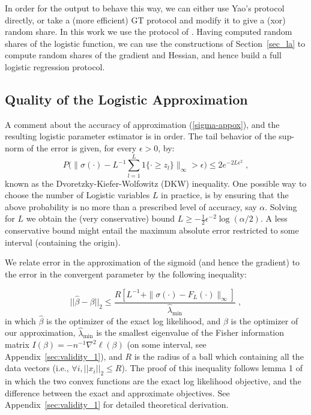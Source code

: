 \documentclass[11pt]{article}
\begin{document}
In order for the output to behave this way, we can either use Yao's protocol directly, or take a (more efficient) GT protocol and modify it to give a (xor) random share.  In this work we use the protocol of \citet{gt_proto}.  Having computed random shares of the logistic function, we can use the constructions of Section~\ref{sec_la} to compute random shares of the gradient and Hessian, and hence build a full logistic regression protocol.
















\subsection{Quality of the Logistic Approximation}\label{sec:ECDF}
A comment about the accuracy of approximation (\ref{sigma-appox}), and the resulting logistic parameter estimator is in order. The tail behavior of the sup-norm of the error is given, for every $\epsilon>0$, by:
\begin{equation}\label{dkw_ineq}
P \Big(\big\|\sigma(\cdot)-L^{-1}\sum_{l=1}^L{1\{\cdot \geq z_l\}}\big\|_\infty>\epsilon \Big)\leq  2e^{-2L\epsilon^2} \; ,
\end{equation}
known as the Dvoretzky-Kiefer-Wolfowitz (DKW) inequality. One possible way to choose the number of Logistic variables $L$ in practice, is by ensuring that the above probability is no more than a prescribed level of accuracy, say $\alpha$. Solving for $L$ we obtain the (very conservative) bound $L\geq -\frac{1}{2}\epsilon^{-2} \log(\alpha/2)$. A less conservative bound might entail the maximum absolute error restricted to some interval (containing the origin). 

We relate error in the approximation of the sigmoid (and hence the gradient) to the error in the convergent parameter by the following inequality:

\begin{equation}\label{parm_err_bound}
||\hat\beta-\beta||_2 \leq \frac{R [L^{-1}+\|\sigma(\cdot)-F_L(\cdot)\|_\infty ] }{\hat\lambda_{\text{min}}} \; ,
\end{equation}
in which $\hat\beta$ is the optimizer of the exact log likelihood, and $\beta$ is the optimizer of our approximation, $\hat\lambda_{\text{min}}$ is the smallest eigenvalue of the Fisher information matrix $I(\beta) = -n^{-1}\nabla^2\ell(\beta)$ (on some interval, see Appendix~\ref{sec:validity_1}), and $R$ is the radius of a ball which containing all the data vectors (i.e., $\forall i, ||x_i||_2 \leq R$).  The proof of this inequality follows lemma 1 of \cite{Chaudhuri} in which the two convex functions are the exact log likelihood objective, and the difference between the exact and approximate objectives. See Appendix~\ref{sec:validity_1} for detailed theoretical derivation.
\end{document}
